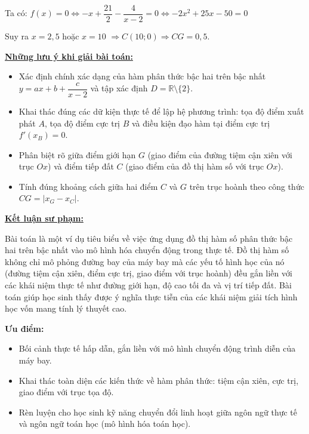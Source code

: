 \documentclass[12pt,a4paper,oneside]{book}
\theoremstyle{theorem}
\theoremstyle{definition}
\begin{document}
        \noindent Ta có: $f(x) = 0 \Leftrightarrow -x + \dfrac{21}{2} - \dfrac{4}{x - 2} = 0 \Leftrightarrow -2x^2 + 25x - 50 = 0 $
        
        \noindent Suy ra $x=2,5$ hoặc $x=10$ $\Rightarrow C(10; 0) \Rightarrow CG = 0{,}5.$
    
     \textbf{\underline{Những lưu ý khi giải bài toán:}}
        \begin{itemize}
            \item Xác định chính xác dạng của hàm phân thức bậc hai trên bậc nhất $y = ax + b + \dfrac{c}{x - 2}$ và tập xác định $D = \mathbb{R} \setminus \{2\}$.
            \item Khai thác đúng các dữ kiện thực tế để lập hệ phương trình: tọa độ điểm xuất phát $A$, tọa độ điểm cực trị $B$ và điều kiện đạo hàm tại điểm cực trị $f'(x_B) = 0$.
            \item Phân biệt rõ giữa điểm giới hạn $G$ (giao điểm của đường tiệm cận xiên với trục $Ox$) và điểm tiếp đất $C$ (giao điểm của đồ thị hàm số với trục $Ox$).
            \item Tính đúng khoảng cách giữa hai điểm $C$ và $G$ trên trục hoành theo công thức $CG = |x_G - x_C|$.
        \end{itemize}
    
    \textbf{\underline{Kết luận sư phạm:}}
    
    Bài toán là một ví dụ tiêu biểu về việc ứng dụng đồ thị hàm số phân thức bậc hai trên bậc nhất vào mô hình hóa chuyển động trong thực tế. Đồ thị hàm số không chỉ mô phỏng đường bay của máy bay mà các yếu tố hình học của nó (đường tiệm cận xiên, điểm cực trị, giao điểm với trục hoành) đều gắn liền với các khái niệm thực tế như đường giới hạn, độ cao tối đa và vị trí tiếp đất. Bài toán giúp học sinh thấy được ý nghĩa thực tiễn của các khái niệm giải tích hình học vốn mang tính lý thuyết cao.
    
    \textbf{Ưu điểm:}
    \begin{itemize}
        \item Bối cảnh thực tế hấp dẫn, gắn liền với mô hình chuyển động trình diễn của máy bay.
        \item Khai thác toàn diện các kiến thức về hàm phân thức: tiệm cận xiên, cực trị, giao điểm với trục tọa độ.
        \item Rèn luyện cho học sinh kỹ năng chuyển đổi linh hoạt giữa ngôn ngữ thực tế và ngôn ngữ toán học (mô hình hóa toán học).
    \end{itemize}
    
\end{document}
